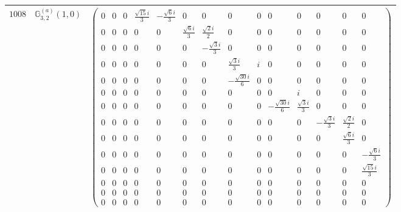 \documentclass[fleqn,8pt,landscape]{jsarticle}
\begin{document}
\begin{center}
\begin{longtable}{ccc}
$ 1008 $ & $ \mathbb{G}_{3,2}^{(a)}(1,0) $ & $ \begin{pmatrix} 0 & 0 & 0 & \frac{\sqrt{15} i}{3} & - \frac{\sqrt{6} i}{3} & 0 & 0 & 0 & 0 & 0 & 0 & 0 & 0 & 0 \\ 0 & 0 & 0 & 0 & 0 & \frac{\sqrt{6} i}{3} & \frac{\sqrt{2} i}{2} & 0 & 0 & 0 & 0 & 0 & 0 & 0 \\ 0 & 0 & 0 & 0 & 0 & 0 & - \frac{\sqrt{3} i}{3} & 0 & 0 & 0 & 0 & 0 & 0 & 0 \\ 0 & 0 & 0 & 0 & 0 & 0 & 0 & \frac{\sqrt{3} i}{3} & i & 0 & 0 & 0 & 0 & 0 \\ 0 & 0 & 0 & 0 & 0 & 0 & 0 & - \frac{\sqrt{30} i}{6} & 0 & 0 & 0 & 0 & 0 & 0 \\ 0 & 0 & 0 & 0 & 0 & 0 & 0 & 0 & 0 & 0 & i & 0 & 0 & 0 \\ 0 & 0 & 0 & 0 & 0 & 0 & 0 & 0 & 0 & - \frac{\sqrt{30} i}{6} & \frac{\sqrt{3} i}{3} & 0 & 0 & 0 \\ 0 & 0 & 0 & 0 & 0 & 0 & 0 & 0 & 0 & 0 & 0 & - \frac{\sqrt{3} i}{3} & \frac{\sqrt{2} i}{2} & 0 \\ 0 & 0 & 0 & 0 & 0 & 0 & 0 & 0 & 0 & 0 & 0 & 0 & \frac{\sqrt{6} i}{3} & 0 \\ 0 & 0 & 0 & 0 & 0 & 0 & 0 & 0 & 0 & 0 & 0 & 0 & 0 & - \frac{\sqrt{6} i}{3} \\ 0 & 0 & 0 & 0 & 0 & 0 & 0 & 0 & 0 & 0 & 0 & 0 & 0 & \frac{\sqrt{15} i}{3} \\ 0 & 0 & 0 & 0 & 0 & 0 & 0 & 0 & 0 & 0 & 0 & 0 & 0 & 0 \\ 0 & 0 & 0 & 0 & 0 & 0 & 0 & 0 & 0 & 0 & 0 & 0 & 0 & 0 \\ 0 & 0 & 0 & 0 & 0 & 0 & 0 & 0 & 0 & 0 & 0 & 0 & 0 & 0 \end{pmatrix} $ \\ \hline

\end{longtable}
\end{center}
\end{document}
